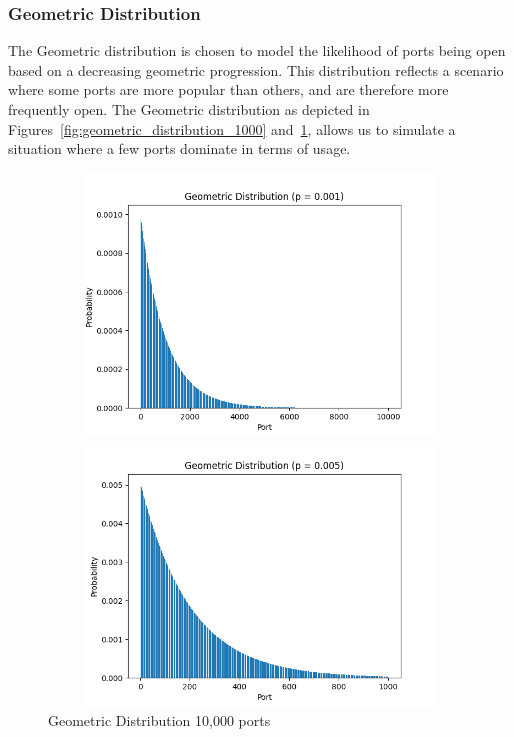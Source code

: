 \subsubsection{Geometric Distribution}

The Geometric distribution is chosen to model the likelihood of ports being open based on a decreasing geometric progression. This distribution reflects a scenario where some ports are more popular than others, and are therefore more frequently open. The Geometric distribution as depicted in Figures~\ref{fig:geometric_distribution_1000} and~\ref{fig:geometric_distribution_10000}, allows us to simulate a situation where a few ports dominate in terms of usage.

\begin{figure}[h]
\begin{adjustwidth}{-3cm}{-1cm}
\centering
\begin{minipage}{.45\textwidth}
  \centering
\includegraphics[width=12cm, height=7cm, keepaspectratio]{entropy/img/geometric_distribution_1000.png}
    \caption{Geometric Distribution 1,000 ports}
    \label{fig:geometric_distribution_1000}
\end{minipage}
\hspace{1.5cm}
\begin{minipage}{.45\textwidth}
\includegraphics[width=12cm, height=7cm, keepaspectratio]{entropy/img/geometric_distribution_10000.png}
    \caption{Geometric Distribution 10,000 ports}
    \label{fig:geometric_distribution_10000}
\end{minipage}
\end{adjustwidth}
\end{figure}

